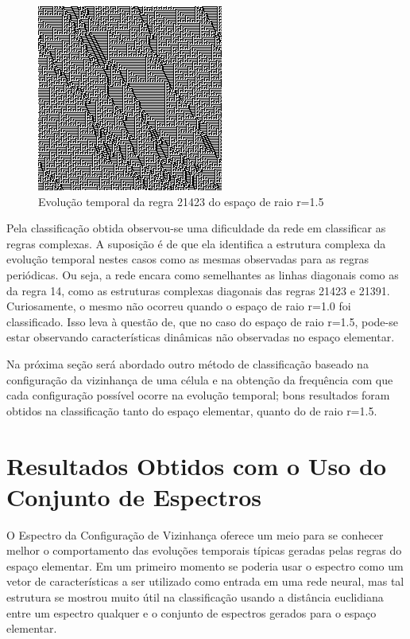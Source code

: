 \documentclass[12pt,a4paper]{report}
\begin{document}
	\begin{figure}[H]
		\centering
		\includegraphics[scale=1.0]{./img/ca_sample_21423.png}
		\caption{Evolução temporal da regra 21423 do espaço de raio r=1.5}
		\label{fig:regra21423r1.5}
	\end{figure}
	
	Pela classificação obtida observou-se uma dificuldade da rede em classificar as regras complexas. A suposição é de que ela identifica a estrutura complexa da evolução temporal nestes casos como as mesmas observadas para as regras periódicas. Ou seja, a rede encara como semelhantes as linhas diagonais como as da regra 14, como as estruturas complexas diagonais das regras 21423 e  21391. Curiosamente, o mesmo não ocorreu quando o espaço de raio r=1.0 foi classificado. Isso leva à questão de, que no caso do espaço de raio r=1.5, pode-se estar observando características dinâmicas não observadas no espaço elementar.
	
	Na próxima seção será abordado outro método de classificação baseado na configuração da vizinhança de uma célula e na obtenção da frequência com que cada configuração possível ocorre na evolução temporal; bons resultados foram obtidos na classificação tanto do espaço elementar, quanto do de raio r=1.5.
	
	\section{Resultados Obtidos com o Uso do Conjunto de Espectros}
	\label{ResultadosObtidoUsoBaseEspectros}
	
	O Espectro da Configuração de Vizinhança oferece um meio para se conhecer melhor o comportamento das evoluções temporais típicas geradas pelas regras do espaço elementar. Em um primeiro momento se poderia usar o espectro como um vetor de características a ser utilizado como entrada em uma rede neural, mas tal estrutura se mostrou muito útil na classificação usando a distância euclidiana entre um espectro qualquer e o conjunto de espectros gerados para o espaço elementar.
	
\end{document}
